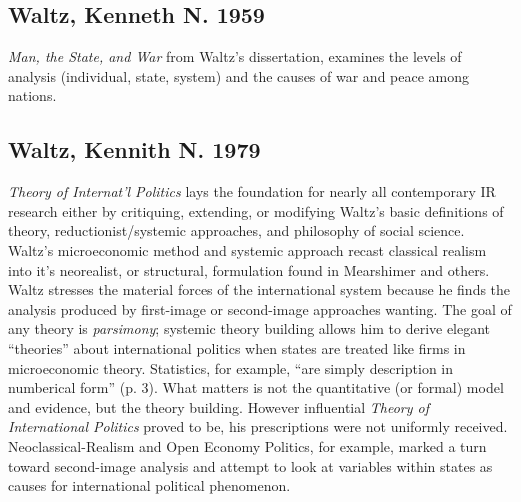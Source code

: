\documentclass[11pt]{article}
\begin{document}
\subsection{Waltz, Kenneth N. 1959}
\label{sec-5-8}
\emph{Man, the State, and War} from Waltz's dissertation, examines the
levels of analysis (individual, state, system) and the causes of war
and peace among nations. 
\subsection{Waltz, Kennith N. 1979}
\label{sec-5-9}
\emph{Theory of Internat'l Politics} lays the foundation for nearly
all contemporary IR research either by critiquing, extending, or
modifying Waltz's basic definitions of theory, reductionist/systemic
approaches, and philosophy of social science. Waltz's microeconomic
method and systemic approach recast classical realism into it's
neorealist, or structural, formulation found in Mearshimer and
others. Waltz stresses the material forces of the international system
because he finds the analysis produced by first-image or second-image
approaches wanting. The goal of any theory is \emph{parsimony}; systemic
theory building allows him to derive elegant ``theories'' about
international politics when states are treated like firms in
microeconomic theory. Statistics, for example, ``are simply description
in numberical form'' (p. 3). What matters is not the quantitative (or
formal) model and evidence, but the theory building. However
influential \emph{Theory of International Politics} proved to be, his
prescriptions were not uniformly received. Neoclassical-Realism and
Open Economy Politics, for example, marked a turn toward second-image
analysis and attempt to look at variables within states as causes for
international political phenomenon. 
\end{document}
